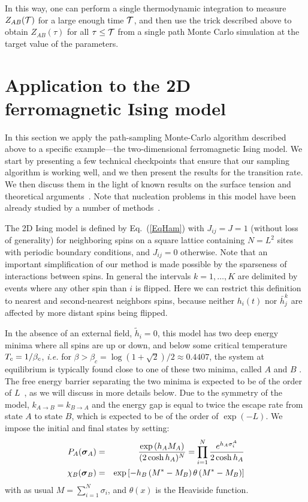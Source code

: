 \documentclass[aps,twocolumn,floats,pre,amsmath,superscriptaddress]{revtex4}
\let\s=\sigma \let\t=\tau \let\f=\varphi \let\ph=\varphi\let\c=\chi
\def\TT{{\cal T}}\def\NN{{\cal N}} \def\BB{{\cal B}}\def\II{{\cal I}}
\def\to{\rightarrow} \def\la{\langle} \def\ra{\rangle}
\newcommand{\<}{\langle}
\renewcommand{\>}{\rangle}
\newcommand{\bea}{\begin{eqnarray}}
\newcommand{\eea}{\end{eqnarray}}
\newcommand{\bs}{ \mbox{\boldmath$\sigma$}}
\begin{document}
In this way, one can perform a single thermodynamic integration to measure 
$Z_{AB}(\TT)$ for a large enough time $\TT$, and then use the trick described above
to obtain $Z_{AB}(\t)$ for all $\t \leq \TT$ from a single path Monte Carlo simulation at
the target value of the parameters.



\section{Application to the 2D ferromagnetic Ising model}\label{sec:results}

In this section we apply the path-sampling Monte-Carlo algorithm described above to a
specific example---the two-dimensional ferromagnetic Ising model. 
We start by presenting a few technical checkpoints that ensure that
our sampling algorithm is working well, 
 and we then present the results for
the transition rate.
We then discuss them in the light of known results on the surface
tension and theoretical arguments~\cite{gallavotti,martinelli}.
Note that nucleation problems in this model have been already studied
by a number of methods~\cite{venturoli,shearising}.


The 2D Ising model is defined by Eq.~(\ref{EqHam})
with $J_{ij}=J=1$ (without loss of generality) for neighboring spins on a 
square lattice 
containing $N=L^2$ sites 
with periodic boundary conditions, and $J_{ij}=0$ otherwise. 
Note that an important simplification of our method is made possible by the sparseness
of interactions between spins. In general the
intervals $k=1,\ldots,K$ are delimited by events where any other spin than $i$
is flipped. Here we can restrict this definition to nearest and
second-nearest neighbors spins, because neither $h_i(t)$ nor $\bar h^k_j$
are affected by more distant spins being flipped.

In the absence of an external field, $\tilde{h}_i =0$, 
this model has two deep energy minima where all spins are up or down,
and below some critical temperature $T_c=1/\beta_c$, {\em i.e.} for
$\beta>\beta_c=\log(1+\sqrt{2})/2\approx 0.4407$, the system 
 at equilibrium is typically found close to
one of these two minima, called $A$ and $B$ \cite{onsager,gallavotti}. 
The free energy barrier separating the two minima is expected to be of the order
of $L$~\cite{onsager,gallavotti,martinelli}, as we will discuss in more details below.
Due to the
symmetry of the model, $k_{A\to B}=k_{B\to A}$ and the energy gap is equal to
twice the escape rate from state $A$ to state $B$, 
which is expected to be of
the order of $\exp(-L)$.
We impose
the initial and final states by setting:
\bea
P_A(\bs_A)&=&\frac{\exp\left(h_A M_A\right)}{(2\cosh h_A)^N} 
= \prod_{i=1}^N \frac{e^{h_A \s_i^A}}{2\cosh h_A}
\\
\chi_B(\bs_B)&=&\exp\left[-h_B \left(M^*-M_B \right)
\theta \left(M^*-M_B \right)\right]\nonumber
\eea
with as usual $M=\sum_{i=1}^N\sigma_i$, and $\theta(x)$ is the Heaviside function.
\end{document}
